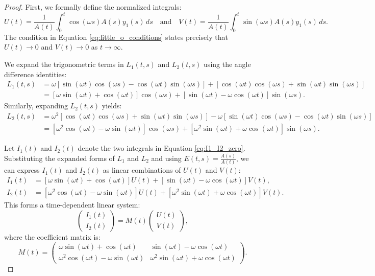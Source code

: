 \documentclass[10pt,reqno]{amsart}
\theoremstyle{definition}
\begin{document}
	\begin{proof}
		First, we formally define the normalized integrals:
		\[ U(t) = \frac{1}{A(t)} \int_0^t \cos(\omega s) A(s) y_1(s) \, ds \quad \text{and} \quad V(t) = \frac{1}{A(t)} \int_0^t \sin(\omega s) A(s) y_1(s) \, ds. \]
		The condition in Equation \eqref{eq:little_o_conditions} states precisely that $U(t) \to 0$ and $V(t) \to 0$ as $t \to \infty$.
		
		We expand the trigonometric terms in $L_1(t, s)$ and $L_2(t, s)$ using the angle difference identities:
		\begin{align*}
			L_1(t, s) &= \omega [\sin(\omega t)\cos(\omega s) - \cos(\omega t)\sin(\omega s)] + [\cos(\omega t)\cos(\omega s) + \sin(\omega t)\sin(\omega s)] \\
			&= [\omega \sin(\omega t) + \cos(\omega t)] \cos(\omega s) + [\sin(\omega t) - \omega \cos(\omega t)] \sin(\omega s).
		\end{align*}
		Similarly, expanding $L_2(t, s)$ yields:
		\begin{align*}
			L_2(t, s) &= \omega^2 [\cos(\omega t)\cos(\omega s) + \sin(\omega t)\sin(\omega s)] - \omega [\sin(\omega t)\cos(\omega s) - \cos(\omega t)\sin(\omega s)] \\
			&= [\omega^2 \cos(\omega t) - \omega \sin(\omega t)] \cos(\omega s) + [\omega^2 \sin(\omega t) + \omega \cos(\omega t)] \sin(\omega s).
		\end{align*}
		
		Let $I_1(t)$ and $I_2(t)$ denote the two integrals in Equation \eqref{eq:I1_I2_zero}. Substituting the expanded forms of $L_1$ and $L_2$ and using $E(t, s) = \frac{A(s)}{A(t)}$, we can express $I_1(t)$ and $I_2(t)$ as linear combinations of $U(t)$ and $V(t)$:
		\begin{align*}
			I_1(t) &= [\omega \sin(\omega t) + \cos(\omega t)] U(t) + [\sin(\omega t) - \omega \cos(\omega t)] V(t), \\
			I_2(t) &= [\omega^2 \cos(\omega t) - \omega \sin(\omega t)] U(t) + [\omega^2 \sin(\omega t) + \omega \cos(\omega t)] V(t).
		\end{align*}
		This forms a time-dependent linear system:
		\[ \begin{pmatrix} I_1(t) \\ I_2(t) \end{pmatrix} = M(t) \begin{pmatrix} U(t) \\ V(t) \end{pmatrix}, \]
		where the coefficient matrix is:
		\[ M(t) = \begin{pmatrix} \omega \sin(\omega t) + \cos(\omega t) & \sin(\omega t) - \omega \cos(\omega t) \\ \omega^2 \cos(\omega t) - \omega \sin(\omega t) & \omega^2 \sin(\omega t) + \omega \cos(\omega t) \end{pmatrix}. \]
		

\end{proof}
\end{document}
